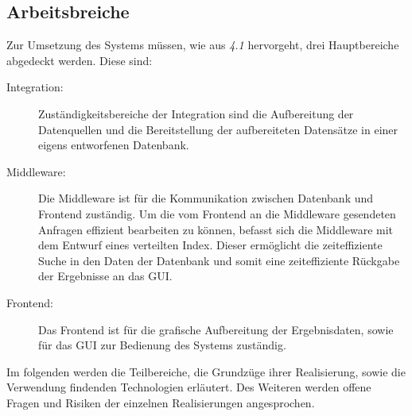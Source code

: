 \subsection{Arbeitsbreiche}
Zur Umsetzung des Systems müssen, wie aus \textit{4.1} hervorgeht, drei Hauptbereiche abgedeckt werden. Diese sind:
\begin{description}
\item[Integration:] Zuständigkeitsbereiche der Integration sind die Aufbereitung der Datenquellen und die Bereitstellung der aufbereiteten Datensätze in einer eigens entworfenen Datenbank.

\item[Middleware:] Die Middleware ist für die Kommunikation zwischen Datenbank und Frontend zuständig. Um die vom Frontend an die Middleware gesendeten Anfragen effizient bearbeiten zu können, befasst sich die Middleware mit dem Entwurf eines verteilten Index. Dieser ermöglicht die zeiteffiziente Suche in den Daten der Datenbank und somit eine zeiteffiziente Rückgabe der Ergebnisse an das GUI.

\item[Frontend:] Das Frontend ist für die grafische Aufbereitung der Ergebnisdaten, sowie für das GUI zur Bedienung des Systems zuständig.
\end{description}
Im folgenden werden die Teilbereiche, die Grundzüge ihrer Realisierung, sowie die Verwendung findenden Technologien erläutert. Des Weiteren werden offene Fragen und Risiken der einzelnen Realisierungen angesprochen.